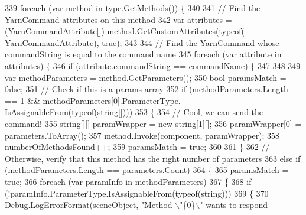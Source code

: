 \begin{DoxyCode}
339                 \textcolor{keywordflow}{foreach} (var method \textcolor{keywordflow}{in} type.GetMethods()) \{
340 
341                     \textcolor{comment}{// Find the YarnCommand attributes on this method}
342                     var attributes = (YarnCommandAttribute[]) method.GetCustomAttributes(typeof(
      YarnCommandAttribute), \textcolor{keyword}{true});
343 
344                     \textcolor{comment}{// Find the YarnCommand whose commandString is equal to the command name}
345                     \textcolor{keywordflow}{foreach} (var attribute \textcolor{keywordflow}{in} attributes) \{
346                         \textcolor{keywordflow}{if} (attribute.commandString == commandName) \{
347 
348 
349                             var methodParameters = method.GetParameters();
350                             \textcolor{keywordtype}{bool} paramsMatch = \textcolor{keyword}{false};
351                             \textcolor{comment}{// Check if this is a params array}
352                             \textcolor{keywordflow}{if} (methodParameters.Length == 1 && methodParameters[0].ParameterType.
      IsAssignableFrom(typeof(\textcolor{keywordtype}{string}[])))
353                                 \{
354                                     \textcolor{comment}{// Cool, we can send the command!}
355                                     \textcolor{keywordtype}{string}[][] paramWrapper = \textcolor{keyword}{new} \textcolor{keywordtype}{string}[1][];
356                                     paramWrapper[0] = parameters.ToArray();
357                                     method.Invoke(component, paramWrapper);
358                                     numberOfMethodsFound++;
359                                     paramsMatch = \textcolor{keyword}{true};
360 
361                             \}
362                             \textcolor{comment}{// Otherwise, verify that this method has the right number of parameters}
363                             \textcolor{keywordflow}{else} \textcolor{keywordflow}{if} (methodParameters.Length == parameters.Count)
364                             \{
365                                 paramsMatch = \textcolor{keyword}{true};
366                                 \textcolor{keywordflow}{foreach} (var paramInfo \textcolor{keywordflow}{in} methodParameters)
367                                 \{
368                                     \textcolor{keywordflow}{if} (!paramInfo.ParameterType.IsAssignableFrom(typeof(\textcolor{keywordtype}{string})))
369                                     \{
370                                         Debug.LogErrorFormat(sceneObject, \textcolor{stringliteral}{"Method \(\backslash\)"\{0\}\(\backslash\)" wants to respond
}
\end{DoxyCode}
